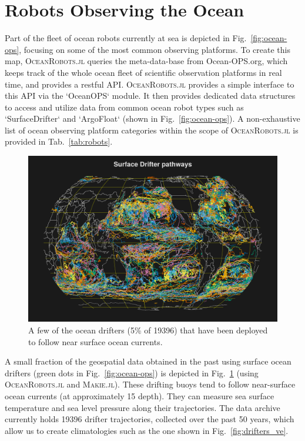\documentclass{juliacon}[12pt]
\newcommand{\pkg}[1]{{\small \textsc{#1}}}
\begin{document}
\section{Robots Observing the Ocean}

Part of the fleet of ocean robots currently at sea is depicted in Fig.~\ref{fig:ocean-ops}, focusing on some of the most common observing platforms. To create this map, \pkg{OceanRobots.jl} queries the meta-data-base from Ocean-OPS.org, which keeps track of the whole ocean fleet of scientific observation platforms in real time, and provides a restful API. \pkg{OceanRobots.jl} provides a simple interface to this API via the `OceanOPS` module. It then provides dedicated data structures to access and utilize data from common ocean robot types such as  `SurfaceDrifter` and `ArgoFloat` (shown in Fig.~\ref{fig:ocean-ops}). A non-exhaustive list of ocean observing platform categories within the scope of \pkg{OceanRobots.jl} is provided in Tab.~\ref{tab:robots}.

\begin{figure}[t]
\centerline{\includegraphics[width=\columnwidth]{figs/20240528_drifters_5percent.png}}
\caption{A few of the ocean drifters (5\% of 19396) that have been deployed to follow near surface ocean currents.}
\label{fig:drifters}
\end{figure}

A small fraction of the geospatial data obtained in the past using surface ocean drifters (green dots in Fig.~\ref{fig:ocean-ops}) is depicted in Fig.~\ref{fig:drifters} (using \pkg{OceanRobots.jl} and \pkg{Makie.jl}). These drifting buoys tend to follow near-surface ocean currents (at approximately 15 depth). They can measure sea surface temperature and sea level pressure along their trajectories. The data archive currently holds 19396 drifter trajectories, collected over the past 50 years, which allow us to create climatologies such as the one shown in Fig.~\ref{fig:drifters_ve}.
\end{document}
